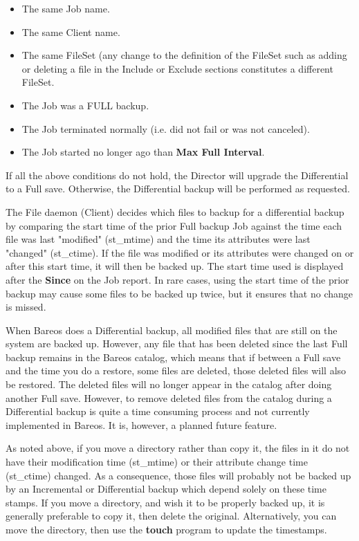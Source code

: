 {\begin{description}
\begin{description}
\begin{itemize}
\item The same Job name.
\item The same Client name.
\item The same FileSet (any change to the definition of  the FileSet such as
adding or deleting a file in the  Include or Exclude sections constitutes a
different FileSet.
\item The Job was a FULL backup.
\item The Job terminated normally (i.e. did not fail or was not  canceled).
\item The Job started no longer ago than {\bf Max Full Interval}.
\end{itemize}

If all the above conditions do not hold, the Director will  upgrade the
Differential to a Full save. Otherwise, the  Differential backup will be
performed as requested.

The File daemon (Client) decides which files to backup for a
differential backup by comparing the start time of the prior Full backup
Job against the time each file was last "modified" (st\_mtime) and the
time its attributes were last "changed" (st\_ctime).  If the file was
modified or its attributes were changed on or after this start time, it
will then be backed up.  The start time used is displayed after the {\bf
Since} on the Job report.  In rare cases, using the start time of the
prior backup may cause some files to be backed up twice, but it ensures
that no change is missed.

When Bareos does a Differential backup, all modified files that are
still on the system are backed up.  However, any file that has been
deleted since the last Full backup remains in the Bareos catalog, which
means that if between a Full save and the time you do a restore, some
files are deleted, those deleted files will also be restored.  The
deleted files will no longer appear in the catalog after doing another
Full save.  However, to remove deleted files from the catalog during a
Differential backup is quite a time consuming process and not currently
implemented in Bareos.  It is, however, a planned future feature.

As noted above, if you move a directory rather than copy it, the
files in it do not have their modification time (st\_mtime) or
their attribute change time (st\_ctime) changed.  As a
consequence, those files will probably not be backed up by an
Incremental or Differential backup which depend solely on these
time stamps.  If you move a directory, and wish it to be
properly backed up, it is generally preferable to copy it, then
delete the original. Alternatively, you can move the directory, then
use the {\bf touch} program to update the timestamps.


\end{description}
\end{description}}
